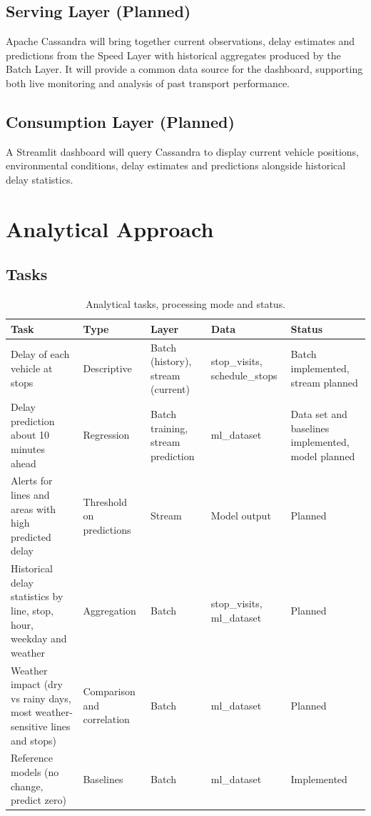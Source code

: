 \documentclass[11pt]{article}
\begin{document}
\subsection{Serving Layer (Planned)}

Apache Cassandra will bring together current observations, delay estimates and predictions from the Speed Layer with historical aggregates produced by the Batch Layer. It will provide a common data source for the dashboard, supporting both live monitoring and analysis of past transport performance.

\subsection{Consumption Layer (Planned)}

A Streamlit dashboard will query Cassandra to display current vehicle positions, environmental conditions, delay estimates and predictions alongside historical delay statistics.

\section{Analytical Approach}
\label{sec:analytics}

\subsection{Tasks}

\begin{table}[H]
\centering
\small
\caption{Analytical tasks, processing mode and status.}\label{tab:tasks}
\begin{tabular}{|>{\raggedright\arraybackslash}p{3.1cm}|>{\raggedright\arraybackslash}p{2.2cm}|>{\raggedright\arraybackslash}p{2.3cm}|>{\raggedright\arraybackslash}p{2.4cm}|>{\raggedright\arraybackslash}p{2.5cm}|}
\hline
\textbf{Task} & \textbf{Type} & \textbf{Layer} & \textbf{Data} & \textbf{Status} \\
\hline
Delay of each vehicle at stops & Descriptive & Batch (history), stream (current) & stop\_visits, schedule\_stops & Batch implemented, stream planned \\
\hline
Delay prediction about 10 minutes ahead & Regression & Batch training, stream prediction & ml\_dataset & Data set and baselines implemented, model planned \\
\hline
Alerts for lines and areas with high predicted delay & Threshold on predictions & Stream & Model output & Planned \\
\hline
Historical delay statistics by line, stop, hour, weekday and weather & Aggregation & Batch & stop\_visits, ml\_dataset & Planned \\
\hline
Weather impact (dry vs rainy days, most weather-sensitive lines and stops) & Comparison and correlation & Batch & ml\_dataset & Planned \\
\hline
Reference models (no change, predict zero) & Baselines & Batch & ml\_dataset & Implemented \\
\hline
\end{tabular}
\end{table}
\end{document}
